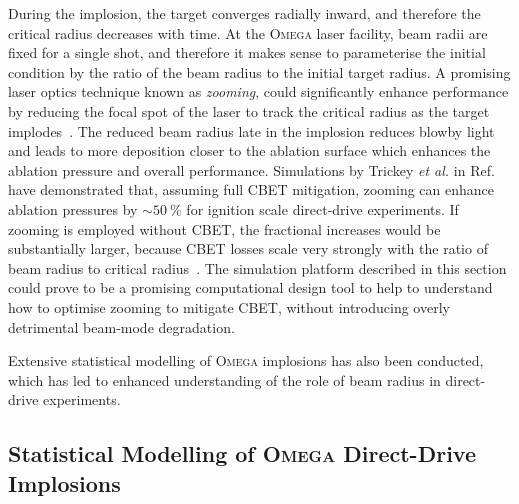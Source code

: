 During the implosion, the target converges radially inward, and therefore the critical radius decreases with time.
At the \textsc{Omega} laser facility, beam radii are fixed for a single shot, and therefore it makes sense to parameterise the initial condition by the ratio of the beam radius to the initial target radius.
A promising laser optics technique known as \textit{zooming}, could significantly enhance performance by reducing the focal spot of the laser to track the critical radius as the target implodes~\cite{kehne_implementation_2013}.
The reduced beam radius late in the implosion reduces blowby light and leads to more deposition closer to the ablation surface which enhances the ablation pressure and overall performance.
Simulations by Trickey \textit{et al.} in Ref.~\cite{trickey_physics_2024} have demonstrated that, assuming full \ac{CBET} mitigation, zooming can enhance ablation pressures by $\sim50\ \%$ for ignition scale direct-drive experiments.
If zooming is employed without \ac{CBET}, the fractional increases would be substantially larger, because \ac{CBET} losses scale very strongly with the ratio of beam radius to critical radius~\cite{colaitis_exploration_2023}.
The simulation platform described in this section could prove to be a promising computational design tool to help to understand how to optimise zooming to mitigate \ac{CBET}, without introducing overly detrimental beam-mode degradation.

Extensive statistical modelling of \textsc{Omega} implosions has also been conducted, which has led to enhanced understanding of the role of beam radius in direct-drive experiments.

\subsection{Statistical Modelling of \textsc{Omega} Direct-Drive Implosions}%
\label{sec:Res1_OMEGA_stat_modelling}

